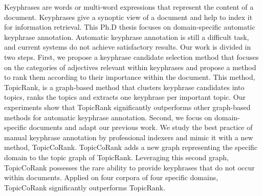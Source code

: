 Keyphrases are words or multi-word expressions that represent the content of a
document. Keyphrases give a synoptic view of a document and help to index it for
information retrieval. This Ph.D thesis focuses on domain-specific automatic
keyphrase annotation. Automatic keyphrase annotation is still a difficult task,
and current systems do not achieve satisfactory results. Our work is divided in
two steps. First, we propose a keyphrase candidate selection method that focuses
on the categories of adjectives relevant within keyphrases and propose a method
to rank them according to their importance within the document. This method,
TopicRank, is a graph-based method that clusters keyphrase candidates into
topics, ranks the topics and extracts one keyphrase per important topic. Our
experiments show that TopicRank significantly outperforms other graph-based
methods for automatic keyphrase annotation. Second, we focus on domain-specific
documents and adapt our previous work. We study the best practice of manual
keyphrase annotation by professional indexers and mimic it with a new method,
TopicCoRank. TopicCoRank adds a new graph representing the specific domain to
the topic graph of TopicRank. Leveraging this second graph, TopicCoRank
possesses the rare ability to provide keyphrases that do not occur within
documents. Applied on four corpora of four specific domains, TopicCoRank
significantly outperforms TopicRank. 

